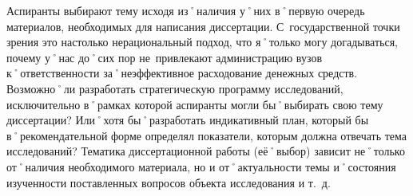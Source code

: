 \begin{drama}
	\maxspeaks Аспиранты выбирают тему исходя из˚наличия у˚них в˚первую очередь материалов, необходимых для написания диссертации. С~государственной точки зрения это настолько нерациональный подход, что я˚только могу догадываться, почему у˚нас до˚сих пор не~привлекают администрацию вузов к˚ответственности за˚неэффективное расходование денежных средств. Возможно˚ли разработать стратегическую программу исследований, исключительно в˚рамках которой аспиранты могли бы˚выбирать свою тему диссертации? Или˚хотя бы˚разработать индикативный план, который бы в˚рекомендательной форме определял показатели, которым должна отвечать тема исследований?
	\michaelspeaks Тематика диссертационной работы (её˚выбор) зависит не˚только от˚наличия необходимого материала, но и от˚актуальности темы и˚состояния изученности поставленных вопросов объекта исследования и т.~д.
	

\end{drama}
